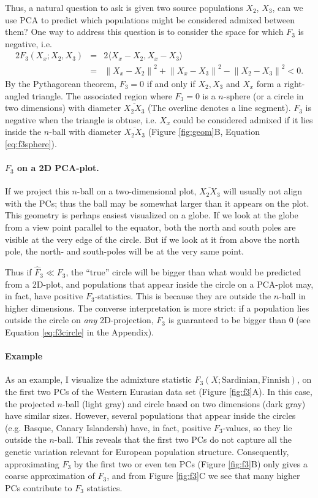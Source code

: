 \documentclass[12pt,fullpage, a4paper]{article}
\newcommand{\normsq}[1]{\left\lVert#1\right\rVert^2}
\begin{document}
Thus, a natural question to ask is given two source populations $X_2$, $X_3$, can we use PCA to predict which populations might be considered admixed between them? One way to address this question is to consider the space for which $F_3$ is negative, i.e. 
\begin{eqnarray}
2 F_3(X_x; X_2, X_3) &=& 2\langle  X_x - X_2, X_x - X_3 \rangle \nonumber\\
      &=& \normsq{X_x - X_2} + \normsq{X_x - X_3}  - \normsq{X_2 - X_3} < 0 \label{eq:f3neg}\text{.}
\end{eqnarray}
By the Pythagorean theorem, $F_3 = 0 $ if and only if $X_2, X_3$ and $X_x$ form a right-angled triangle. The associated region where $F_3=0$ is a $n$-sphere (or a circle in two dimensions) with diameter $\overline{X_2X_3}$ (The overline denotes a line segment). $F_3$ is negative when the triangle is obtuse, i.e. $X_x$ could be considered admixed if it lies inside the $n$-ball with diameter $\overline{X_2X_3}$ (Figure \ref{fig:geom}B, Equation \ref{eq:f3sphere}). 

\paragraph{$F_3$ on a 2D PCA-plot.} 
 If we project this $n$-ball on a two-dimensional plot, $\overline{X_2X_3}$ will usually not align with the PCs; thus the ball may be somewhat larger than it appears on the plot. This geometry is perhaps easiest visualized on a globe. If we look at the globe from a view point parallel to the equator, both the north and south poles are visible at the very edge of the circle. But if we look at it from above the north pole, the north- and south-poles will be at the very same point.
 
 Thus if $\hat{F}_3 \ll F_3$, the ``true'' circle will be bigger than what would be predicted from a 2D-plot, and populations that appear inside the circle on a PCA-plot may, in fact, have positive $F_3$-statistics. This is because they are outside the $n$-ball in higher dimensions. The converse interpretation is more strict: if a population lies outside the circle on \emph{any} 2D-projection, $F_3$ is guaranteed to be bigger than 0 (see Equation \ref{eq:f3circle} in the Appendix).

\paragraph{Example}
As an example, I visualize the admixture statistic $F_3(X; \text{Sardinian}, \text{Finnish})$, on the first two PCs of the Western Eurasian data set (Figure \ref{fig:f3}A). In this case, the projected $n$-ball (light gray) and circle based on two dimensions (dark gray) have similar sizes. However, several populations that appear inside the circles (e.g. Basque, Canary Islandersh) have, in fact, positive $F_3$-values, so they lie outside the $n$-ball. This reveals that the first two PCs do not capture all the genetic variation relevant for  European population structure.  Consequently, approximating $F_3$ by the first two or even ten PCs (Figure \ref{fig:f3}B) only gives a coarse approximation of $F_3$, and from Figure \ref{fig:f3}C we see that many higher PCs contribute to $F_3$ statistics.
\end{document}
